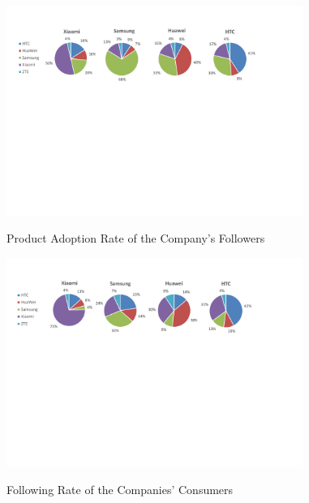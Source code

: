 \documentclass{llncs}
\begin{document}
\begin{figure}[t]
  \vspace*{-0.3cm}
  \begin{minipage}[t]{\textwidth}
    \centering
    \includegraphics[width=0.86\textwidth]{res/isu_c_correlation_a_pie.pdf}\\
    \vspace*{-0.6cm}
    \caption{Product Adoption Rate of the Company's Followers}\label{fig:casestudya}
  \end{minipage}%

  \vspace*{-0.2cm}
  \begin{minipage}[t]{\linewidth}
  \centering
  \includegraphics[width=0.86\textwidth]{res/isu_c_correlation_b_pie.pdf}\\
   \vspace*{-0.6cm}
  \caption{Following Rate of the Companies' Consumers}\label{fig:casestudyb}
  \end{minipage}
  \vspace*{-0.25cm}
\end{figure}
\end{document}
